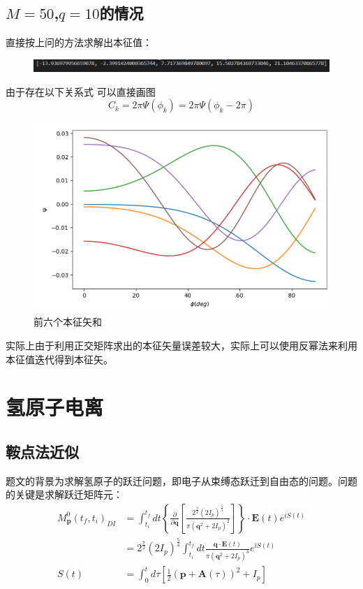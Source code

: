 \documentclass[a4paper]{ctexart}
\begin{document}
\subsection{$M=50$,$q=10$的情况}
直接按上问的方法求解出本征值：
\begin{figure}[hbt]
	\centering
	\includegraphics[width=12cm]{./fig/eigen_3.png}
\end{figure}
由于存在以下关系式
可以直接画图
\begin{equation}
C_{k}=2 \pi \Psi\left(\phi_{k}\right)=2 \pi \Psi\left(\phi_{k}-2 \pi\right)
\end{equation}
\begin{figure}[hbt]
	\centering
	\includegraphics[width=12cm]{./fig/eigen_4.png}
	\caption{前六个本征矢和}
\end{figure}
实际上由于利用正交矩阵求出的本征矢量误差较大，实际上可以使用反幂法来利用本征值迭代得到本征矢。
\section{氢原子电离}
\subsection{鞍点法近似}
题文的背景为求解氢原子的跃迁问题，即电子从束缚态跃迁到自由态的问题。问题的关键是求解跃迁矩阵元：
\begin{equation}
\begin{aligned} M_{\mathbf{p}}^{0}\left(t_{f}, t_{i}\right)_{D I} &=\int_{t_{i}}^{t_{f}} d t\left\{\frac{\partial}{\partial \mathbf{q}}\left[\frac{2^{\frac{3}{2}}\left(2 I_{p}\right)^{\frac{5}{4}}}{\pi\left(\mathbf{q}^{2}+2 I_{p}\right)^{2}}\right]\right\} \cdot \mathbf{E}(t) e^{i S(t)} \\ &=2^{\frac{7}{2}}\left(2 I_{p}\right)^{\frac{5}{4}} \int_{t_{i}}^{t_{f}} d t \frac{\mathbf{q} \cdot \mathbf{E}(t)}{\pi\left(\mathbf{q}^{2}+2 I_{p}\right)^{3}} e^{i S(t)} \\
S(t)&=\int_{0}^{t} d \tau\left[\frac{1}{2}(\mathbf{p}+\mathbf{A}(\tau))^{2}+I_{p}\right]\end{aligned}
\end{equation}
\end{document}
